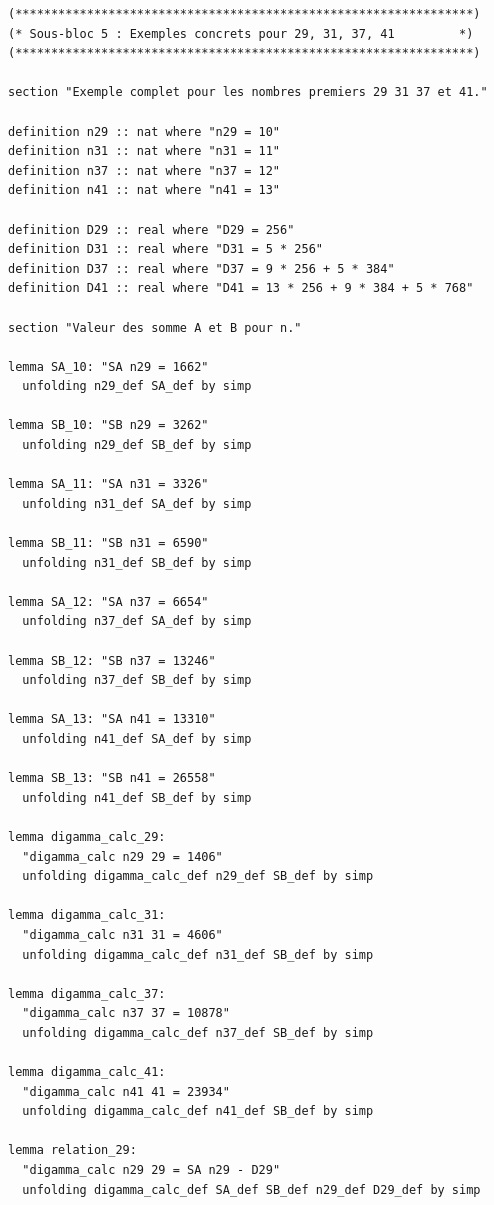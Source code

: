 \documentclass[a4paper,11pt]{article}
\begin{document}
\begin{holcode}[title={\textcolor{white}{File: methode\_spectral.thy -- Part 2/4}}]
\begin{lstlisting}
(****************************************************************)
(* Sous-bloc 5 : Exemples concrets pour 29, 31, 37, 41         *)
(****************************************************************)

section "Exemple complet pour les nombres premiers 29 31 37 et 41."

definition n29 :: nat where "n29 = 10"
definition n31 :: nat where "n31 = 11"
definition n37 :: nat where "n37 = 12"
definition n41 :: nat where "n41 = 13"

definition D29 :: real where "D29 = 256"
definition D31 :: real where "D31 = 5 * 256"
definition D37 :: real where "D37 = 9 * 256 + 5 * 384"
definition D41 :: real where "D41 = 13 * 256 + 9 * 384 + 5 * 768"

section "Valeur des somme A et B pour n."

lemma SA_10: "SA n29 = 1662"
  unfolding n29_def SA_def by simp

lemma SB_10: "SB n29 = 3262"
  unfolding n29_def SB_def by simp

lemma SA_11: "SA n31 = 3326"
  unfolding n31_def SA_def by simp

lemma SB_11: "SB n31 = 6590"
  unfolding n31_def SB_def by simp

lemma SA_12: "SA n37 = 6654"
  unfolding n37_def SA_def by simp

lemma SB_12: "SB n37 = 13246"
  unfolding n37_def SB_def by simp

lemma SA_13: "SA n41 = 13310"
  unfolding n41_def SA_def by simp

lemma SB_13: "SB n41 = 26558"
  unfolding n41_def SB_def by simp

lemma digamma_calc_29:
  "digamma_calc n29 29 = 1406"
  unfolding digamma_calc_def n29_def SB_def by simp

lemma digamma_calc_31:
  "digamma_calc n31 31 = 4606"
  unfolding digamma_calc_def n31_def SB_def by simp

lemma digamma_calc_37:
  "digamma_calc n37 37 = 10878"
  unfolding digamma_calc_def n37_def SB_def by simp

lemma digamma_calc_41:
  "digamma_calc n41 41 = 23934"
  unfolding digamma_calc_def n41_def SB_def by simp

lemma relation_29:
  "digamma_calc n29 29 = SA n29 - D29"
  unfolding digamma_calc_def SA_def SB_def n29_def D29_def by simp


\end{lstlisting}
\end{holcode}
\end{document}
